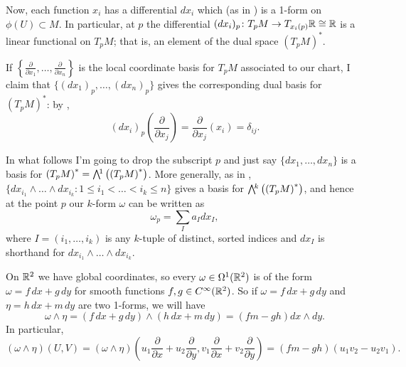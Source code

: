 Now, each function $x_i$ has a differential $dx_i$ which (as in ) is a 1-form on $\phi(U) \subset M$. In particular, at $p$ the differential $(dx_i)_p \colon\thinspace\! T_p M \to T_{x_i(p)}\mathbb{R} \cong \mathbb{R}$ is a linear functional on $T_pM$; that is, an element of the dual space $\left(T_pM\right)^\ast$.

If $\left\{\frac{\partial}{\partial x_1}, \dots , \frac{\partial}{\partial x_n}\right\}$ is the local coordinate basis for $T_pM$ associated to our chart, I claim that $\{(dx_1)_p, \dots , (dx_n)_p\}$ gives the corresponding dual basis for $\left(T_pM\right)^\ast$: by ,
\[
	(dx_i)_p \left(\frac{\partial}{\partial x_j}\right) = \frac{\partial}{\partial x_j}(x_i) = \delta_{ij}.
\]

In what follows I'm going to drop the subscript $p$ and just say $\{dx_1, \dots, dx_n\}$ is a basis for $\left(T_pM\right)^\ast = \ext{1}\left(\left(T_pM\right)^\ast\right)$. More generally, as in , $\{dx_{i_1} \wedge \dots \wedge dx_{i_k}: 1 \leq i_1 < \dots < i_k \leq n\}$ gives a basis for $\ext{k}\left(\left(T_pM\right)^\ast \right)$, and hence at the point $p$ our $k$-form $\omega$ can be written as
\[
	\omega_p = \sum_I a_I dx_I,
\]
where $I = (i_1, \dots , i_k)$ is any $k$-tuple of distinct, sorted indices and $dx_I$ is shorthand for $dx_{i_1} \wedge \dots \wedge dx_{i_k}$.

\begin{example}
	On $\mathbb{R}^2$ we have global coordinates, so every $\omega \in \Omega^1(\mathbb{R}^2)$ is of the form $\omega = f\, dx + g\, dy$ for smooth functions $f,g \in C^\infty (\mathbb{R}^2)$. So if $\omega = f\, dx + g \, dy$ and $\eta = h\, dx + m\, dy$ are two 1-forms, we will have
	\[
		\omega \wedge \eta = (f\, dx + g\, dy) \wedge (h\, dx + m\, dy) = (fm - gh) dx \wedge dy.
	\]
	In particular,
	\[
		(\omega \wedge \eta)(U,V) = (\omega \wedge \eta)\left(u_1 \frac{\partial}{\partial x} + u_2 \frac{\partial}{\partial y}, v_1 \frac{\partial}{\partial x} + v_2 \frac{\partial}{\partial y}\right) = (fm-gh)(u_1 v_2 - u_2 v_1).
	\]
\end{example}

